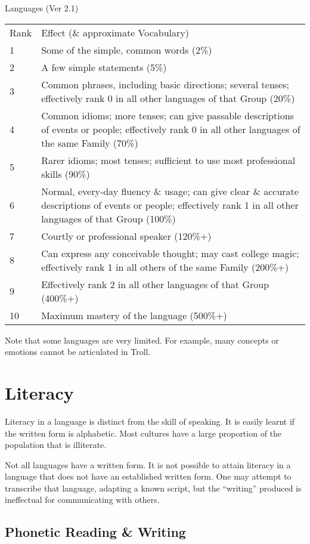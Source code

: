 \begin{Chapter}{Languages (Ver 2.1)}
\begin{tabularx}{\columnwidth}{lX} \\
Rank	& Effect (\& approximate Vocabulary) \\
1	& Some of the simple, common words (2\%) \\
2	& A few simple statements (5\%) \\
3	& Common  phrases,  including  basic  directions; several tenses; effectively rank 0 in all other languages of that Group (20\%) \\
4	& Common  idioms;  more  tenses;  can  give passable descriptions of events or people; effectively rank 0 in all other languages of the same Family (70\%) \\
5	& Rarer  idioms;  most  tenses;  sufficient  to use most professional skills (90\%) \\
6	& Normal,  every-day  fluency  \&  usage;  can give  clear  \&  accurate  descriptions  of events or people; effectively rank 1 in all other languages of that Group (100\%) \\
7	& Courtly or professional speaker (120\%+) \\
8	& Can  express  any  conceivable  thought; may cast college magic; effectively rank 1 in all others of the same Family (200\%+) \\ 
9	& Effectively  rank  2  in  all  other  languages of that Group (400\%+) \\
10	& Maximum  mastery  of the language (500\%+) \\
\end{tabularx}

Note that some languages are very limited.  For example, many concepts
or emotions cannot be articulated in Troll.

\section{Literacy}

Literacy in a language is distinct from the skill of speaking.  It is
easily learnt if the written form is alphabetic.  Most cultures have a
large proportion of the population that is illiterate.

Not all languages have a written form.  It is not possible to attain
literacy in a language that does not have an established written form.
One may attempt to transcribe that language, adapting a known script,
but the “writing” produced is ineffectual for communicating with
others.

\subsection{Phonetic Reading \& Writing}


\end{Chapter}
